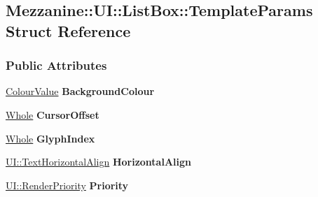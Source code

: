 \hypertarget{structMezzanine_1_1UI_1_1ListBox_1_1TemplateParams}{
\subsection{Mezzanine::UI::ListBox::TemplateParams Struct Reference}
\label{structMezzanine_1_1UI_1_1ListBox_1_1TemplateParams}
}
\subsubsection*{Public Attributes}
\begin{DoxyCompactItemize}
\item 
\hypertarget{structMezzanine_1_1UI_1_1ListBox_1_1TemplateParams_a820792d08ebf69d3a3ea999de44ebbd8}{
\hyperlink{classMezzanine_1_1ColourValue}{ColourValue} {\bfseries BackgroundColour}}
\label{structMezzanine_1_1UI_1_1ListBox_1_1TemplateParams_a820792d08ebf69d3a3ea999de44ebbd8}

\item 
\hypertarget{structMezzanine_1_1UI_1_1ListBox_1_1TemplateParams_af0648dbf3fc6a7811c1b421d90e6537b}{
\hyperlink{namespaceMezzanine_adcbb6ce6d1eb4379d109e51171e2e493}{Whole} {\bfseries CursorOffset}}
\label{structMezzanine_1_1UI_1_1ListBox_1_1TemplateParams_af0648dbf3fc6a7811c1b421d90e6537b}

\item 
\hypertarget{structMezzanine_1_1UI_1_1ListBox_1_1TemplateParams_a912b7ff065d61ae5ece7722a53460215}{
\hyperlink{namespaceMezzanine_adcbb6ce6d1eb4379d109e51171e2e493}{Whole} {\bfseries GlyphIndex}}
\label{structMezzanine_1_1UI_1_1ListBox_1_1TemplateParams_a912b7ff065d61ae5ece7722a53460215}

\item 
\hypertarget{structMezzanine_1_1UI_1_1ListBox_1_1TemplateParams_afdae24ae27365ba9a29b75453681923c}{
\hyperlink{namespaceMezzanine_1_1UI_aebbd46e62bb20d958f1915c1ec6cc549}{UI::TextHorizontalAlign} {\bfseries HorizontalAlign}}
\label{structMezzanine_1_1UI_1_1ListBox_1_1TemplateParams_afdae24ae27365ba9a29b75453681923c}

\item 
\hypertarget{structMezzanine_1_1UI_1_1ListBox_1_1TemplateParams_ac141240cf7065ed14e55147a66c3f502}{
\hyperlink{namespaceMezzanine_1_1UI_ac4c753eb6b5d66350a243acc9ce54130}{UI::RenderPriority} {\bfseries Priority}}
\label{structMezzanine_1_1UI_1_1ListBox_1_1TemplateParams_ac141240cf7065ed14e55147a66c3f502}


\end{DoxyCompactItemize}
